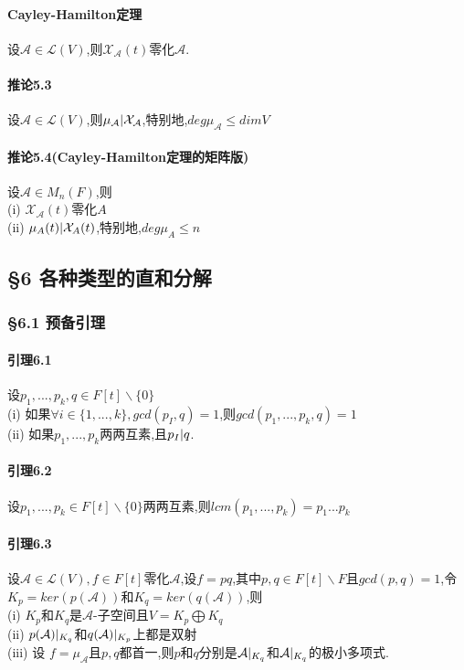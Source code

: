 \documentclass{ctexart}
\begin{document}
\paragraph{Cayley-Hamilton定理}
设$\mathcal{A} \in \mathcal{L}(V)$,则$\mathcal{X}_{\mathcal{A}}(t)$零化$\mathcal{A}$.

\paragraph{推论5.3}
设$\mathcal{A} \in \mathcal{L}(V)$,则$\mu_{\mathcal{A}} \arrowvert \mathcal{X}_{\mathcal{A}}$,特别地,$deg\mu_{\mathcal{A}} \le dimV$

\paragraph{推论5.4(Cayley-Hamilton定理的矩阵版)}
设$\mathcal{A} \in M_{n}(F)$,则\\
(i) $\mathcal{X_{A}}(t)$零化$A$\\
(ii) $\mu_{A}(t) \arrowvert \mathcal{X}_{A}(t)$,特别地,$deg\mu_{A} \le n$\\

\subsection{§6 各种类型的直和分解}

\subsubsection{§6.1 预备引理}

\paragraph{引理6.1}
设$p_{1},...,p_{k},q \in F[t]\backslash \{0\}$\\
(i) 如果$\forall i \in \{1,...,k\},gcd(p_{I},q) = 1$,则$gcd(p_{1},...,p_{k},q) = 1$\\
(ii) 如果$p_{1},...,p_{k}$两两互素,且$p_{I}\arrowvert q$.\\

\paragraph{引理6.2}
设$p_{1},...,p_{k} \in F[t] \backslash \{0\}$两两互素,则$lcm(p_{1},...,p_{k}) = p_{1}...p_{k}$

\paragraph{引理6.3}
设$\mathcal{A} \in \mathcal{L}(V),f\in F[t]$零化$\mathcal{A}$,设$f=pq$,其中$p,q\in F[t] \backslash F$且$gcd(p,q) = 1$,令$K_{p}=ker(p(\mathcal{A}))$和$K_{q}=ker(q(\mathcal{A}))$,则\\
(i) $K_{p}$和$K_{q}$是$\mathcal{A}$-子空间且$V=K_{p}\bigoplus K_{q}$\\
(ii) $p(\mathcal{A})\arrowvert_{K_{q}}$和$q(\mathcal{A})\arrowvert_{K_{p}}$上都是双射\\
(iii) 设 $f=\mu_{\mathcal{A}}$且$p,q$都首一,则$p$和$q$分别是$\mathcal{A}\arrowvert_{K_{q}}$和$\mathcal{A}\arrowvert_{K_{q}}$的极小多项式.
\end{document}
